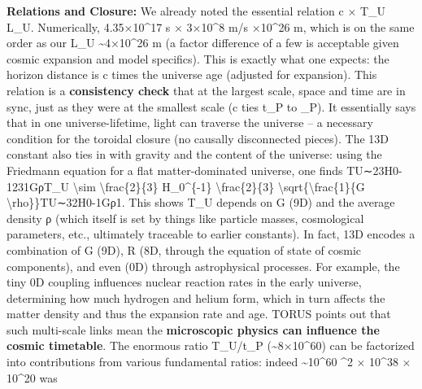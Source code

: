 \documentclass[
]{article}
\begin{document}
{\textbf{Relations and Closure:} We already noted the essential relation
c × T\_U \approx L\_U\hspace{0pt}. Numerically, 4.35×10\^{}17 s × 3×10\^{}8
m/s ×10\^{}26 m, which is on the same order as our L\_U
\textasciitilde4×10\^{}26 m (a factor difference of a few is acceptable
given cosmic expansion and model specifics)\hspace{0pt}. This is exactly
what one expects: the horizon distance is c times the universe age
(adjusted for expansion). This relation is a \textbf{consistency check}
that at the largest scale, space and time are in sync, just as they were
at the smallest scale (c ties t\_P to \ell\_P). It essentially says that in
one universe-lifetime, light can traverse the universe -- a necessary
condition for the toroidal closure (no causally disconnected
pieces)\hspace{0pt}. The 13D constant also ties in with gravity and the
content of the universe: using the Friedmann equation for a flat
matter-dominated universe, one finds TU∼23H0-1\approx231GρT\_U
\textbackslash sim \textbackslash frac\{2\}\{3\} H\_0\^{}\{-1\} \approx
\textbackslash frac\{2\}\{3\}
\textbackslash sqrt\{\textbackslash frac\{1\}\{G
\textbackslash rho\}\}TU\hspace{0pt}∼32\hspace{0pt}H0-1\hspace{0pt}\hspace{0pt}Gρ1\hspace{0pt}\hspace{0pt}\hspace{0pt}.
This shows T\_U depends on G (9D) and the average density ρ (which
itself is set by things like particle masses, cosmological parameters,
etc., ultimately traceable to earlier constants). In fact, 13D encodes a
combination of G (9D), R (8D, through the equation of state of cosmic
components), and even \alpha (0D) through astrophysical
processes\hspace{0pt}. For example, the tiny 0D coupling \alpha influences
nuclear reaction rates in the early universe, determining how much
hydrogen and helium form, which in turn affects the matter density and
thus the expansion rate and age. TORUS points out that such multi-scale
links mean the \textbf{microscopic physics can influence the cosmic
timetable}. The enormous ratio T\_U/t\_P (\textasciitilde8×10\^{}60) can
be factorized into contributions from various fundamental ratios: indeed
\textasciitilde10\^{}60 \^{}2 × 10\^{}38 × 10\^{}20 was
}
\end{document}
